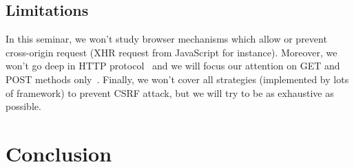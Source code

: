 \documentclass[a4paper,11pt]{article}
\begin{document}
  \subsection{Limitations}

  In this seminar, we won't study browser mechanisms which allow or prevent cross-origin 
  request (XHR request from JavaScript for instance). Moreover, we won't go deep in HTTP 
  protocol~\cite{rfc2616} and we will focus our attention on GET and POST methods 
  only~\cite[5.1.1]{rfc2616}. Finally, we won't cover all strategies (implemented by lots 
  of framework) to prevent CSRF attack, but we will try to be as exhaustive as possible.
  
  \section{Conclusion}
  
  


\end{document}
